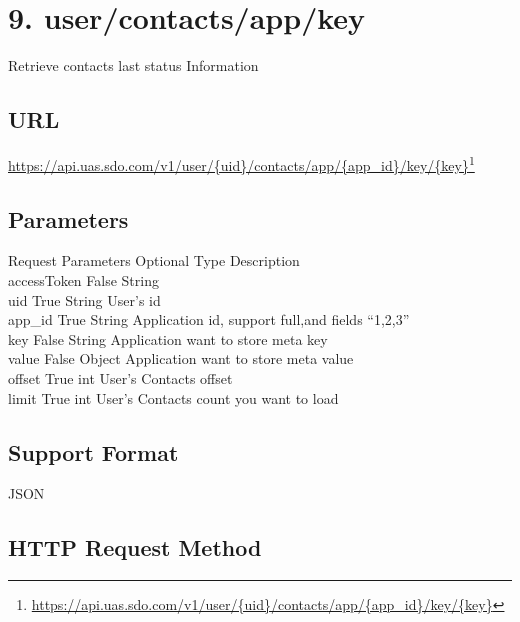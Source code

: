 \chapter{9. user\slash contacts\slash app\slash key}
\label{usercontactsappkey}

Retrieve contacts last status Information

\section{URL}
\label{url}

\href{https://api.uas.sdo.com/v1/user/{uid}/contacts/app/{app_id}/key/{key}}{https:/\slash api.uas.sdo.com\slash v1\slash user\slash \{uid\}\slash contacts\slash app\slash \{app\_id\}\slash key\slash \{key\}}\footnote{\href{https://api.uas.sdo.com/v1/user/{uid}/contacts/app/{app_id}/key/{key}}{https:/\slash api.uas.sdo.com\slash v1\slash user\slash \{uid\}\slash contacts\slash app\slash \{app\_id\}\slash key\slash \{key\}}}

\section{Parameters}
\label{parameters}

Request Parameters \textbar{} Optional \textbar{} Type \textbar{} Description\\
accessToken \textbar{} False \textbar{} String \textbar{}\\
uid \textbar{} True \textbar{} String \textbar{} User's id\\
app\_id \textbar{} True \textbar{} String \textbar{} Application id, support full,and fields ``1,2,3''\\
key \textbar{} False \textbar{} String \textbar{} Application want to store meta key\\
value \textbar{} False \textbar{} Object \textbar{} Application want to store meta value\\
offset \textbar{} True \textbar{} int \textbar{} User's Contacts offset\\
limit \textbar{} True \textbar{} int \textbar{} User's Contacts count you want to load 

\section{Support Format}
\label{supportformat}

JSON

\section{HTTP Request Method}
\label{httprequestmethod}

